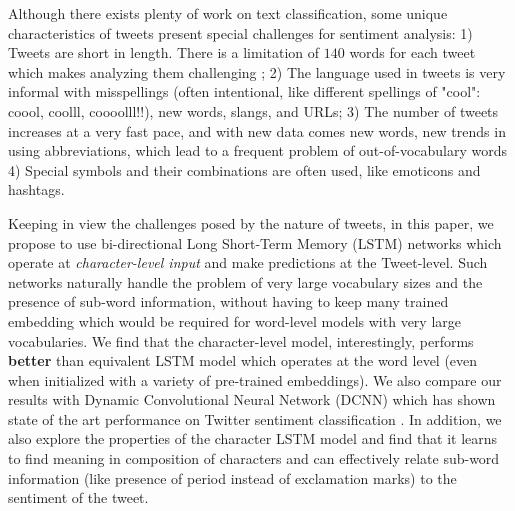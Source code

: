 \documentclass{article} %
\begin{document}

Although there exists plenty of work on text classification, some unique characteristics of tweets present special challenges for sentiment analysis:
1) Tweets are short in length. There is a limitation of $140$ words for each tweet which makes analyzing them challenging \cite{mehrotra2013improving}; 2) The language used in tweets is very informal with misspellings (often intentional, like different spellings of "cool": coool, coolll, coooolll!!), new words, slangs, and URLs;
3) The number of tweets increases at a very fast pace, and with new data comes new words, new trends in using abbreviations, which lead to a frequent problem of out-of-vocabulary words
4) Special symbols and their combinations are often used, like emoticons and hashtags.

Keeping in view the challenges posed by the nature of tweets, 
in this paper, we propose to use bi-directional Long Short-Term Memory (LSTM) \cite{hochreiter1997long} 
networks which operate at {\it character-level input} and make predictions at the Tweet-level. Such networks naturally handle the problem of very large vocabulary sizes and the presence of sub-word information, without having to keep many trained embedding which would be required for word-level models  with very large vocabularies.
We find that the character-level model, interestingly, performs {\bf better} than equivalent LSTM model which operates at the word level (even when initialized with a variety of pre-trained embeddings).
We also compare our results with Dynamic Convolutional Neural Network (DCNN) \cite{kalchbrenner2014convolutional} which has shown state of the art performance on Twitter sentiment classification \cite{severynunitn}.
In addition, we also explore the properties of the character LSTM model and find that it learns to find meaning in composition of characters and can effectively relate sub-word information (like presence of period instead of exclamation marks) to the sentiment of the tweet.


\end{document}
